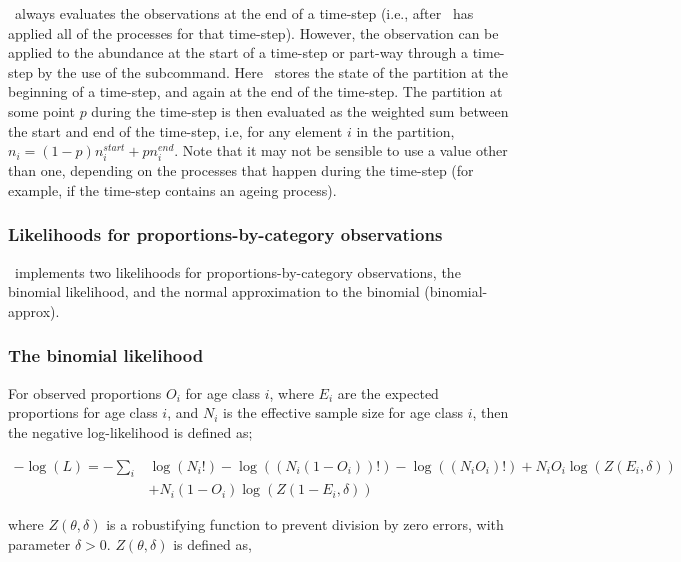 {{\TODO

\SPM\ always evaluates the observations at the end of a time-step (i.e., after \SPM\ has applied all of the processes for that time-step). However, the observation can be applied to the abundance at the start of a time-step or part-way through a time-step by the use of the  subcommand. Here \SPM\ stores the state of the partition at the beginning of a time-step, and again at the end of the time-step. The partition at some point $p$ during the time-step is then evaluated as the weighted sum between the start and end of the time-step, i.e, for any element $i$ in the partition, $n_i=(1-p) n_i^{start} + p n_i^{end}$. Note that it may not be sensible to use a value other than one, depending on the processes that happen during the time-step (for example, if the time-step contains an ageing process).

\TODOend

\subsubsection{Likelihoods for proportions-by-category observations}

\SPM\ implements two likelihoods for proportions-by-category observations, the binomial likelihood, and the normal approximation to the binomial (binomial-approx). 

\subsubsection*{The binomial likelihood}

For observed proportions $O_i$ for age class $i$, where $E_i$ are the expected proportions for age class $i$, and $N_i$ is the effective sample size for age class $i$, then the negative log-likelihood is defined as;  

\begin{equation}
  \begin{split}
    -\log \left(L \right)= -\sum\limits_i & \log \left(N_i! \right) - \log \left(\left(N_i \left(1 - O_i \right) \right)! \right) - \log \left(\left(N_i O_i \right)! \right) + N_i O_i \log \left(Z\left(E_i,\delta \right) \right) \\
    &+ N_i \left(1 - O_i \right)\log \left(Z\left(1 - E_i,\delta\right) \right)
  \end{split}
\end{equation}


where $Z \left(\theta,\delta \right)$ is a robustifying function to prevent division by zero errors, with parameter $\delta>0$. $Z \left(\theta,\delta \right)$ is defined as,

}}

